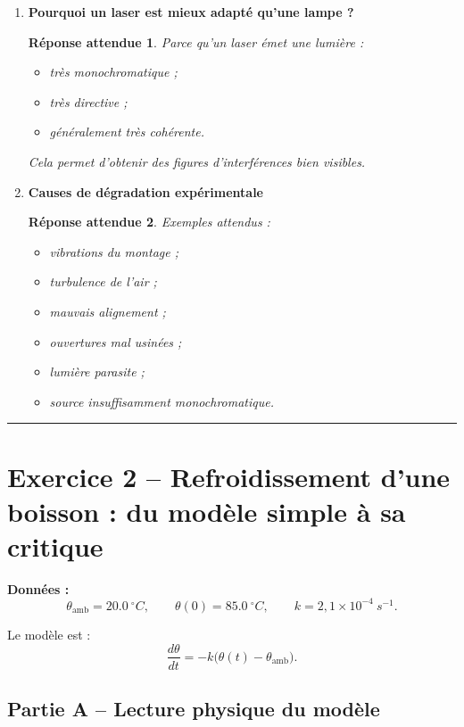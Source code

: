 \documentclass[11pt,a4paper]{article}
\newtheorem*{reponseattendue}{Réponse attendue}
\begin{document}
\begin{enumerate}[label=\textbf{1.\arabic*}, resume, leftmargin=1.6em]
\item \textbf{Pourquoi un laser est mieux adapté qu’une lampe ?}

\begin{reponseattendue}
Parce qu’un laser émet une lumière :
\begin{itemize}
    \item très monochromatique ;
    \item très directive ;
    \item généralement très cohérente.
\end{itemize}
Cela permet d’obtenir des figures d’interférences bien visibles.
\end{reponseattendue}

\item \textbf{Causes de dégradation expérimentale}

\begin{reponseattendue}
Exemples attendus :
\begin{itemize}
    \item vibrations du montage ;
    \item turbulence de l’air ;
    \item mauvais alignement ;
    \item ouvertures mal usinées ;
    \item lumière parasite ;
    \item source insuffisamment monochromatique.
\end{itemize}
\end{reponseattendue}

\end{enumerate}

\vspace{0.6em}
\hrule
\vspace{0.6em}

\section*{Exercice 2 -- Refroidissement d’une boisson : du modèle simple à sa critique}

\noindent\textbf{Données :}
\[
\theta_{\mathrm{amb}}=\SI{20,0}{^\circ C},
\qquad
\theta(0)=\SI{85,0}{^\circ C},
\qquad
k=2{,}1\times 10^{-4}\ \si{s^{-1}}.
\]

Le modèle est :
\[
\frac{d\theta}{dt}=-k\big(\theta(t)-\theta_{\mathrm{amb}}\big).
\]

\subsection*{Partie A -- Lecture physique du modèle}
\end{document}
